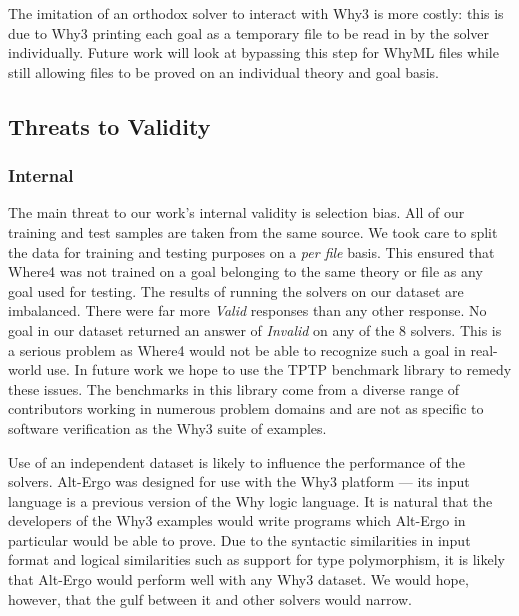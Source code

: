 \documentclass[runningheads,a4paper]{llncs}
\begin{document}
The imitation of an orthodox solver to interact with \textsf{Why3} is more costly: this is due to \textsf{Why3} printing each goal as a temporary file to be read in by the solver individually. Future work will look at bypassing this step for WhyML files while still allowing files to be proved on an individual theory and goal basis.    

\subsection{Threats to Validity}

\subsubsection{Internal}
\label{sec:internal}

The main threat to our work's internal validity is selection bias. All of our training and test samples are taken from the same source. We took care to split the data for training and testing purposes on a \textit{per file} basis. This ensured that \textsf{Where4} was not trained on a goal belonging to the same theory or file as any goal used for testing. 
The results of running the solvers on our dataset are imbalanced. There were far more \textit{Valid} responses than any other response. No goal in our dataset returned an answer of \textit{Invalid} on any of the 8 solvers. This is a serious problem as \textsf{Where4} would not be able to recognize such a goal in real-world use. In future work we hope to use the TPTP benchmark library to remedy these issues. The benchmarks in this library come from a diverse range of contributors working in numerous problem domains \cite{Sutcliffe200139} and are
not as specific to software verification as the \textsf{Why3} suite of examples.

Use of an independent dataset is likely to influence the performance of the solvers. Alt-Ergo was designed for use with the \textsf{Why3} platform --- its input language is a previous version of the Why logic language. It is natural that the developers of the \textsf{Why3} examples would write programs which Alt-Ergo in particular would be able to prove. Due to the syntactic similarities in input format and logical similarities such as support for type polymorphism, it is likely that Alt-Ergo would perform well with any \textsf{Why3} dataset. We would hope, however, that the gulf between it and other solvers would narrow.
\end{document}
